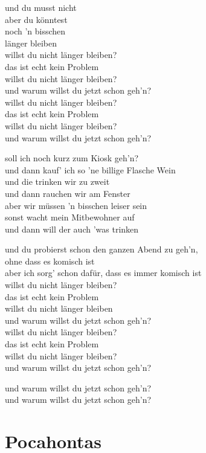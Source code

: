 \documentclass[]{book}
\begin{document}
und du musst nicht\\
aber du könntest\\
noch 'n bisschen\\
länger bleiben\\
willst du nicht länger bleiben?\\
das ist echt kein Problem\\
willst du nicht länger bleiben?\\
und warum willst du jetzt schon geh'n?\\
willst du nicht länger bleiben?\\
das ist echt kein Problem\\
willst du nicht länger bleiben?\\
und warum willst du jetzt schon geh'n?

soll ich noch kurz zum Kiosk geh'n?\\
und dann kauf' ich so 'ne billige Flasche Wein\\
und die trinken wir zu zweit\\
und dann rauchen wir am Fenster\\
aber wir müssen 'n bisschen leiser sein\\
sonst wacht mein Mitbewohner auf\\
und dann will der auch 'was trinken

und du probierst schon den ganzen Abend zu geh'n,\\
ohne dass es komisch ist\\
aber ich sorg' schon dafür, dass es immer komisch ist\\
willst du nicht länger bleiben?\\
das ist echt kein Problem\\
willst du nicht länger bleiben\\
und warum willst du jetzt schon geh'n?\\
willst du nicht länger bleiben?\\
das ist echt kein Problem\\
willst du nicht länger bleiben?\\
und warum willst du jetzt schon geh'n?

und warum willst du jetzt schon geh'n?\\
und warum willst du jetzt schon geh'n?

\hypertarget{pocahontas-2}{%
\section{Pocahontas}\label{pocahontas-2}}
\end{document}
